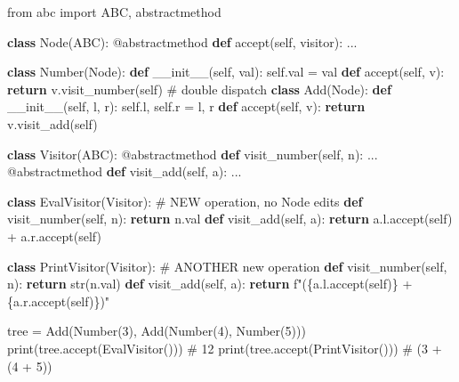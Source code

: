 \documentclass[11pt]{article}
\newenvironment{Shaded}{\begin{snugshade}}{\end{snugshade}}
\newcommand{\AttributeTok}[1]{\textcolor[rgb]{0.16,0.50,0.73}{#1}}
\newcommand{\BuiltInTok}[1]{\textcolor[rgb]{0.50,0.55,0.55}{#1}}
\newcommand{\CommentTok}[1]{\textcolor[rgb]{0.48,0.49,0.49}{#1}}
\newcommand{\ControlFlowTok}[1]{\textcolor[rgb]{0.99,0.74,0.29}{\textbf{#1}}}
\newcommand{\DecValTok}[1]{\textcolor[rgb]{0.96,0.45,0.00}{#1}}
\newcommand{\FunctionTok}[1]{\textcolor[rgb]{0.56,0.27,0.68}{#1}}
\newcommand{\ImportTok}[1]{\textcolor[rgb]{0.15,0.68,0.38}{#1}}
\newcommand{\KeywordTok}[1]{\textcolor[rgb]{0.81,0.81,0.76}{\textbf{#1}}}
\newcommand{\NormalTok}[1]{\textcolor[rgb]{0.81,0.81,0.76}{#1}}
\newcommand{\OperatorTok}[1]{\textcolor[rgb]{0.81,0.81,0.76}{#1}}
\newcommand{\SpecialCharTok}[1]{\textcolor[rgb]{0.24,0.68,0.91}{#1}}
\newcommand{\SpecialStringTok}[1]{\textcolor[rgb]{0.85,0.27,0.33}{#1}}
\newcommand{\VariableTok}[1]{\textcolor[rgb]{0.15,0.68,0.68}{#1}}
\begin{document}
\begin{Shaded}
\begin{Highlighting}[]
\ImportTok{from}\NormalTok{ abc }\ImportTok{import}\NormalTok{ ABC, abstractmethod}

\KeywordTok{class}\NormalTok{ Node(ABC):}
    \AttributeTok{@abstractmethod}
    \KeywordTok{def}\NormalTok{ accept(}\VariableTok{self}\NormalTok{, visitor): ...}

\KeywordTok{class}\NormalTok{ Number(Node):}
    \KeywordTok{def} \FunctionTok{\_\_init\_\_}\NormalTok{(}\VariableTok{self}\NormalTok{, val): }\VariableTok{self}\NormalTok{.val }\OperatorTok{=}\NormalTok{ val}
    \KeywordTok{def}\NormalTok{ accept(}\VariableTok{self}\NormalTok{, v): }\ControlFlowTok{return}\NormalTok{ v.visit\_number(}\VariableTok{self}\NormalTok{)     }\CommentTok{\# double dispatch}
\KeywordTok{class}\NormalTok{ Add(Node):}
    \KeywordTok{def} \FunctionTok{\_\_init\_\_}\NormalTok{(}\VariableTok{self}\NormalTok{, l, r): }\VariableTok{self}\NormalTok{.l, }\VariableTok{self}\NormalTok{.r }\OperatorTok{=}\NormalTok{ l, r}
    \KeywordTok{def}\NormalTok{ accept(}\VariableTok{self}\NormalTok{, v): }\ControlFlowTok{return}\NormalTok{ v.visit\_add(}\VariableTok{self}\NormalTok{)}

\KeywordTok{class}\NormalTok{ Visitor(ABC):}
    \AttributeTok{@abstractmethod}
    \KeywordTok{def}\NormalTok{ visit\_number(}\VariableTok{self}\NormalTok{, n): ...}
    \AttributeTok{@abstractmethod}
    \KeywordTok{def}\NormalTok{ visit\_add(}\VariableTok{self}\NormalTok{, a): ...}

\KeywordTok{class}\NormalTok{ EvalVisitor(Visitor):                  }\CommentTok{\# NEW operation, no Node edits}
    \KeywordTok{def}\NormalTok{ visit\_number(}\VariableTok{self}\NormalTok{, n): }\ControlFlowTok{return}\NormalTok{ n.val}
    \KeywordTok{def}\NormalTok{ visit\_add(}\VariableTok{self}\NormalTok{, a): }\ControlFlowTok{return}\NormalTok{ a.l.accept(}\VariableTok{self}\NormalTok{) }\OperatorTok{+}\NormalTok{ a.r.accept(}\VariableTok{self}\NormalTok{)}

\KeywordTok{class}\NormalTok{ PrintVisitor(Visitor):                 }\CommentTok{\# ANOTHER new operation}
    \KeywordTok{def}\NormalTok{ visit\_number(}\VariableTok{self}\NormalTok{, n): }\ControlFlowTok{return} \BuiltInTok{str}\NormalTok{(n.val)}
    \KeywordTok{def}\NormalTok{ visit\_add(}\VariableTok{self}\NormalTok{, a): }\ControlFlowTok{return} \SpecialStringTok{f"(}\SpecialCharTok{\{}\NormalTok{a}\SpecialCharTok{.}\NormalTok{l}\SpecialCharTok{.}\NormalTok{accept(}\VariableTok{self}\NormalTok{)}\SpecialCharTok{\}}\SpecialStringTok{ + }\SpecialCharTok{\{}\NormalTok{a}\SpecialCharTok{.}\NormalTok{r}\SpecialCharTok{.}\NormalTok{accept(}\VariableTok{self}\NormalTok{)}\SpecialCharTok{\}}\SpecialStringTok{)"}

\NormalTok{tree }\OperatorTok{=}\NormalTok{ Add(Number(}\DecValTok{3}\NormalTok{), Add(Number(}\DecValTok{4}\NormalTok{), Number(}\DecValTok{5}\NormalTok{)))}
\BuiltInTok{print}\NormalTok{(tree.accept(EvalVisitor()))    }\CommentTok{\# 12}
\BuiltInTok{print}\NormalTok{(tree.accept(PrintVisitor()))   }\CommentTok{\# (3 + (4 + 5))}
\end{Highlighting}
\end{Shaded}
\end{document}
